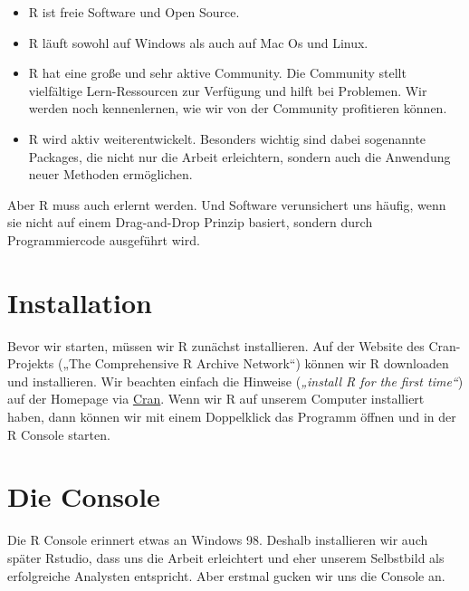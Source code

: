 \documentclass[
]{book}
\providecommand{\tightlist}{%
  \setlength{\itemsep}{0pt}\setlength{\parskip}{0pt}}
\begin{document}
\begin{itemize}
\tightlist
\item
  R ist freie Software und Open Source.
\item
  R läuft sowohl auf Windows als auch auf Mac Os und Linux.
\item
  R hat eine große und sehr aktive Community. Die Community stellt vielfältige Lern-Ressourcen zur Verfügung und hilft bei Problemen. Wir werden noch kennenlernen, wie wir von der Community profitieren können.
\item
  R wird aktiv weiterentwickelt. Besonders wichtig sind dabei sogenannte Packages, die nicht nur die Arbeit erleichtern, sondern auch die Anwendung neuer Methoden ermöglichen.
\end{itemize}

Aber R muss auch erlernt werden. Und Software verunsichert uns häufig, wenn sie nicht auf einem Drag-and-Drop Prinzip basiert, sondern durch Programmiercode ausgeführt wird.

\hypertarget{installation}{%
\section{Installation}\label{installation}}

Bevor wir starten, müssen wir R zunächst installieren. Auf der Website des Cran-Projekts („The Comprehensive R Archive Network``) können wir R downloaden und installieren. Wir beachten einfach die Hinweise (\emph{„install R for the first time``}) auf der Homepage via \href{https://cran.r-project.org/}{Cran}. Wenn wir R auf unserem Computer installiert haben, dann können wir mit einem Doppelklick das Programm öffnen und in der R Console starten.

\hypertarget{die-console}{%
\section{Die Console}\label{die-console}}

Die R Console erinnert etwas an Windows 98. Deshalb installieren wir auch später Rstudio, dass uns die Arbeit erleichtert und eher unserem Selbstbild als erfolgreiche Analysten entspricht. Aber erstmal gucken wir uns die Console an.
\end{document}
